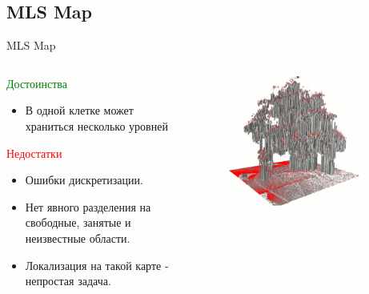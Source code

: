 \documentclass[9pt]{beamer}
\begin{document}
\subsection{MLS Map}

\begin{frame}{MLS Map}
\begin{columns}
\begin{column}{0.50\textwidth}
  \begin{block}{\textcolor{green}{Достоинства}}
    \begin{itemize}
    \item
    { 
      В одной клетке может храниться несколько уровней
    }
    \end{itemize}
  \end{block}

  \begin{block}{\textcolor{red}{Недостатки}}
    \begin{itemize}
    \item
    {
      Ошибки дискретизации.
    }
    \item
    { 
      Нет явного разделения на свободные, занятые и неизвестные области.
    }
    \item
    {
      Локализация на такой карте - непростая задача.
    }
    \end{itemize}
  \end{block}
\end{column}
\begin{column}{0.50\textwidth}
    \begin{figure}[h]
      \centering
      \includegraphics[width=0.9\textwidth]{mls_tree.png}
    \end{figure}
\end{column}
\end{columns}
\end{frame}
\end{document}
